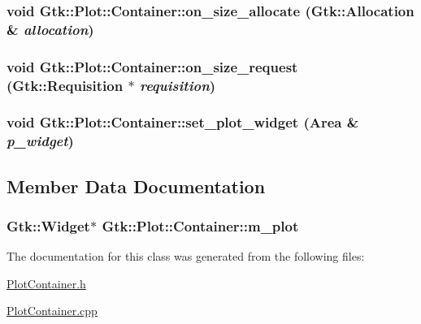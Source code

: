 \label{classGtk_1_1Plot_1_1Container_a5f89abb202ae55f0470dabe6b77c7da8}
\hypertarget{classGtk_1_1Plot_1_1Container_a907cdf74d34d90e1383aeaa3d0a57de6}{
\subsubsection[{on\_\-size\_\-allocate}]{\setlength{\rightskip}{0pt plus 5cm}void Gtk::Plot::Container::on\_\-size\_\-allocate (Gtk::Allocation \& {\em allocation})}}
\label{classGtk_1_1Plot_1_1Container_a907cdf74d34d90e1383aeaa3d0a57de6}
\hypertarget{classGtk_1_1Plot_1_1Container_a0c6fabd4077b44a65349042c4f1e3774}{
\subsubsection[{on\_\-size\_\-request}]{\setlength{\rightskip}{0pt plus 5cm}void Gtk::Plot::Container::on\_\-size\_\-request (Gtk::Requisition $\ast$ {\em requisition})}}
\label{classGtk_1_1Plot_1_1Container_a0c6fabd4077b44a65349042c4f1e3774}
\hypertarget{classGtk_1_1Plot_1_1Container_a1d85757151fbc9bfb8f00e60c30e2df4}{
\subsubsection[{set\_\-plot\_\-widget}]{\setlength{\rightskip}{0pt plus 5cm}void Gtk::Plot::Container::set\_\-plot\_\-widget ({\bf Area} \& {\em p\_\-widget})}}
\label{classGtk_1_1Plot_1_1Container_a1d85757151fbc9bfb8f00e60c30e2df4}


\subsection{Member Data Documentation}
\hypertarget{classGtk_1_1Plot_1_1Container_a152cefd80bbba01059ef963dbeb4ccda}{
\subsubsection[{m\_\-plot}]{\setlength{\rightskip}{0pt plus 5cm}Gtk::Widget$\ast$ {\bf Gtk::Plot::Container::m\_\-plot}}}
\label{classGtk_1_1Plot_1_1Container_a152cefd80bbba01059ef963dbeb4ccda}


The documentation for this class was generated from the following files:\begin{DoxyCompactItemize}
\item 
\hyperlink{PlotContainer_8h}{PlotContainer.h}\item 
\hyperlink{PlotContainer_8cpp}{PlotContainer.cpp}\end{DoxyCompactItemize}
